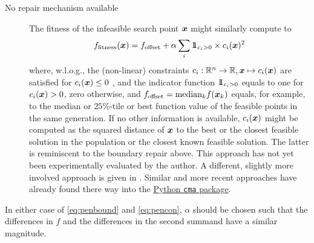 \documentclass{article} %
\newcommand{\R}{\mathbb{R}}
\newcommand{\ve}[1]{\mathchoice{\mbox{\boldmath$\displaystyle#1$}}
  {\mbox{\boldmath$\textstyle#1$}} {\mbox{\boldmath$\scriptstyle#1$}}
  {\mbox{\boldmath$\scriptscriptstyle#1$}}}
\newcommand{\N}{\ensuremath{n}}
\newcommand{\Rn}{\R^{\N}}
\newcommand{\x}{\ve{x}}
\begin{document}
\begin{appendix}
\begin{description}
  \item[No repair mechanism available] The fitness of the
  infeasible search point $\ve{x}$ might similarly compute to
%
  \begin{equation} \label{eq:pencon}
    f_\mathrm{fitness}(\ve{x}) = \offset
         + \alpha \sum_i {1\hspace{-0.33em}1}_{c_i>0}\times c_i(\ve{x})^2
%
   \end{equation}
%
%
 where, w.l.o.g., the (non-linear) constraints $c_i:\Rn\to\R,
 \ve{x}\mapsto c_i(\ve{x})$ are satisfied for $c_i(\ve{x})\le0$ , and
 the indicator function ${1\hspace{-0.33em}1}_{c_i>0}$ equals to one
 for $c_i(\ve{x})>0$, zero otherwise, and $\offset = \mathrm{median}_k
 f(\x_k)$ equals, for example, to the median or $25\%$-tile or best function 
 value of the feasible points
 in the same generation. If no other information is available, $c_i(\x)$ might be computed as the squared distance of $\x$ to the best or the closest feasible solution in the population or the closest known feasible solution. The latter is reminiscent to the boundary repair above. 
 This approach has not yet been experimentally
 evaluated by the author. A different, slightly more involved approach is given in \cite{collange2010multidisciplinary}.
 Similar and more recent approaches \cite{dufosse2021augmented} have already found there way into the \href{https://github.com/CMA-ES/pycma}{Python \texttt{cma} package}.

\end{description}

  In either case of \eqref{eq:penbound} and \eqref{eq:pencon}, $\alpha$
  should be chosen such that the differences in $f$ and the
  differences in the second summand have a similar magnitude.
  
\newpage

\end{appendix}
\end{document}
